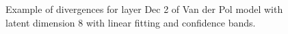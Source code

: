 \begin{figure}[ht]
    \centering
    \begin{minipage}{\textwidth}
    \end{minipage}
    \caption{Example of divergences for layer Dec 2 of Van der Pol model with latent dimension 8 
    with linear fitting and confidence bands.}
    \label{fig:divergence of model example}
\end{figure}



  


